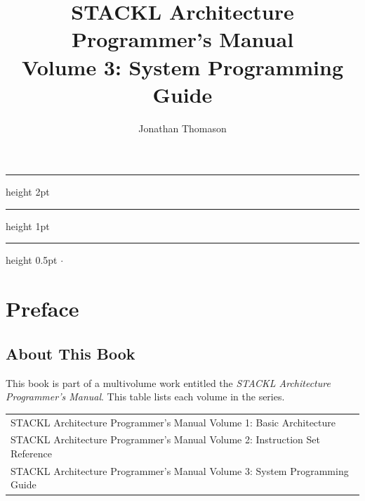 \documentclass[11pt,a4paper,oneside]{book}
\title{
	STACKL Architecture\\
	Programmer's Manual\\
	\large Volume 3: System Programming Guide
}
\author{Jonathan Thomason}
\makeatletter
\renewcommand{\maketitle}{%
  \vspace*{2cm} %
  \begin{center}
    \begingroup
      \hrule height 2pt %
      \vspace{0.5\baselineskip}
      {\Huge \bfseries \@title \par}%
      \vspace{0.5\baselineskip}
      \hrule height 1pt %
    \endgroup
    \par
  \end{center}
  \vfill %
  \begin{center}
    \begingroup
      \footnotesize
      \hrule height 0.5pt %
      \vspace{0.5em}
      \@author \quad $\cdot$ \quad \@date %
      \vspace{0.5em}
    \endgroup
  \end{center}
}
\makeatother
\begin{document}
\frontmatter
\thispagestyle{empty}
\maketitle

\setcounter{page}{0}
\tableofcontents

\chapter{Preface}

\section{About This Book}
This book is part of a multivolume work entitled the \textit{STACKL Architecture
Programmer's Manual}. This table lists each volume in the series.

\begin{table}[H]
\centering
	\begin{tabular}{l}
		STACKL Architecture Programmer's Manual Volume 1: Basic Architecture\\
		STACKL Architecture Programmer's Manual Volume 2: Instruction Set Reference\\
		STACKL Architecture Programmer's Manual Volume 3: System Programming Guide\\
	\end{tabular}
\end{table}

\mainmatter
\end{document}
